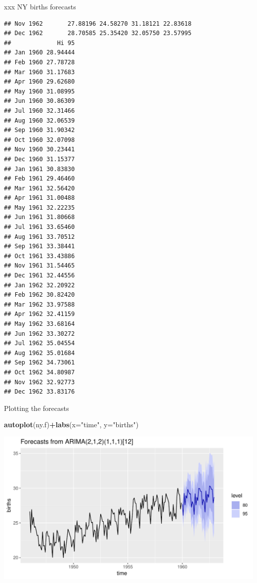 \documentclass[ignorenonframetext,]{beamer}
\newenvironment{Shaded}{\begin{snugshade}}{\end{snugshade}}
\newcommand{\DataTypeTok}[1]{\textcolor[rgb]{0.13,0.29,0.53}{#1}}
\newcommand{\KeywordTok}[1]{\textcolor[rgb]{0.13,0.29,0.53}{\textbf{#1}}}
\newcommand{\NormalTok}[1]{#1}
\newcommand{\OperatorTok}[1]{\textcolor[rgb]{0.81,0.36,0.00}{\textbf{#1}}}
\newcommand{\StringTok}[1]{\textcolor[rgb]{0.31,0.60,0.02}{#1}}
\begin{document}
\begin{frame}[fragile]{xxx NY births forecasts}
\begin{verbatim}
## Nov 1962       27.88196 24.58270 31.18121 22.83618
## Dec 1962       28.70585 25.35420 32.05750 23.57995
##             Hi 95
## Jan 1960 28.94444
## Feb 1960 27.78728
## Mar 1960 31.17683
## Apr 1960 29.62680
## May 1960 31.08995
## Jun 1960 30.86309
## Jul 1960 32.31466
## Aug 1960 32.06539
## Sep 1960 31.90342
## Oct 1960 32.07098
## Nov 1960 30.23441
## Dec 1960 31.15377
## Jan 1961 30.83830
## Feb 1961 29.46460
## Mar 1961 32.56420
## Apr 1961 31.00488
## May 1961 32.22235
## Jun 1961 31.80668
## Jul 1961 33.65460
## Aug 1961 33.70512
## Sep 1961 33.38441
## Oct 1961 33.43886
## Nov 1961 31.54465
## Dec 1961 32.44556
## Jan 1962 32.20922
## Feb 1962 30.82420
## Mar 1962 33.97588
## Apr 1962 32.41159
## May 1962 33.68164
## Jun 1962 33.30272
## Jul 1962 35.04554
## Aug 1962 35.01684
## Sep 1962 34.73061
## Oct 1962 34.80987
## Nov 1962 32.92773
## Dec 1962 33.83176
\end{verbatim}

\normalsize

\end{frame}

\begin{frame}[fragile]{Plotting the forecasts}
\protect\hypertarget{plotting-the-forecasts}{}

\begin{Shaded}
\begin{Highlighting}[]
\KeywordTok{autoplot}\NormalTok{(ny.f)}\OperatorTok{+}\KeywordTok{labs}\NormalTok{(}\DataTypeTok{x=}\StringTok{"time"}\NormalTok{, }\DataTypeTok{y=}\StringTok{"births"}\NormalTok{)}
\end{Highlighting}
\end{Shaded}

\includegraphics{figure/unnamed-chunk-63-1.pdf}

\end{frame}
\end{document}
